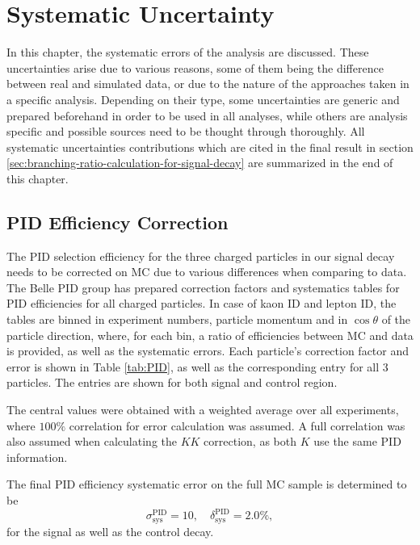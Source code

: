\chapter{Systematic Uncertainty}\label{sec:systematic-uncertainty}
In this chapter, the systematic errors of the analysis are discussed. These uncertainties arise due to various reasons, some of them being the difference between real and simulated data, or due to the nature of the approaches taken in a specific analysis. Depending on their type, some uncertainties are generic and prepared beforehand in order to be used in all analyses, while others are analysis specific and possible sources need to be thought through thoroughly. All systematic uncertainties contributions which are cited in the final result in section \ref{sec:branching-ratio-calculation-for-signal-decay} are summarized in the end of this chapter.

\section{PID Efficiency Correction}\label{sec:pid-efficiency-correction}

The PID selection efficiency for the three charged particles in our signal decay needs to be corrected on MC due to various differences when comparing to data. The Belle PID group has prepared correction factors and systematics tables for PID efficiencies for all charged particles. In case of kaon ID and lepton ID, the tables are binned in experiment numbers, particle momentum and in $\cos\theta$ of the particle direction, where, for each bin, a ratio of efficiencies between MC and data is provided, as well as the systematic errors. Each particle's correction factor and error is shown in Table \ref{tab:PID}, as well as the corresponding entry for all 3 particles. The entries are shown for both signal and control region.

The central values were obtained with a weighted average over all experiments, where $100\%$ correlation for error calculation was assumed. A full correlation was also assumed when calculating the $KK$ correction, as both $K$ use the same PID information.

The final PID efficiency systematic error on the full MC sample is determined to be
\begin{equation}
\sigma_{\mathrm{sys}}^{\mathrm{PID}} = 10,\quad \delta_{\mathrm{sys}}^{\mathrm{PID}} = 2.0\%,
\end{equation}
for the signal as well as the control decay.

